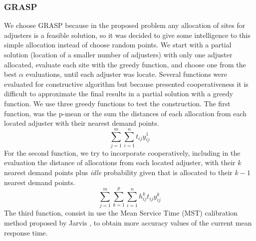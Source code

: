 \subsubsection{GRASP}
We choose GRASP
because
in the proposed problem
any allocation of sites for adjusters
is a feasible solution,
so it was decided to give some intelligence
to this simple allocation
instead of choose
random points.
We start with a partial solution
(location of a smaller number of adjusters)
with only one adjuster allocated,
evaluate each site with the greedy function,
and choose one from the best $\alpha$ evaluations,
until each adjuster was locate.
Several functions were evaluated
for constructive algorithm
but because presented cooperativeness
it is difficult
to approximate the final results
in a partial solution
with a greedy function.
We use three greedy functions
to test the construction.
The first function,
was the p-mean
or the sum the distances
of each allocation 
from each located adjuster
with their nearest demand points.
\begin{equation}
  \label{eq:grasp1}
  \sum_{j=1}^{m}{
    \sum_{i=1}^{n}{
      t_{ij}y_{ij}^{1}
    }
  }
\end{equation}
For the second function,
we try to incorporate cooperatively,
including in the evaluation
the distance of allocations
from each located adjuster,
with their $k$ nearest demand points
plus \textit{idle} probability
given that is allocated
to their $k-1$ nearest demand points.
\begin{equation}
  \label{eq:grasp2}
  \sum_{j=1}^{m}{
    \sum_{k=1}^{p}{
      \sum_{i=1}^{n}{
        h_{ij}^{k}t_{ij}y_{ij}^{k}
      }
    }
  }
\end{equation}
The third function,
consist in use the Mean Service Time (MST) calibration method
proposed by Jarvis \cite{jarvis1985approximating},
to obtain more accuracy values
of the current mean response time.
